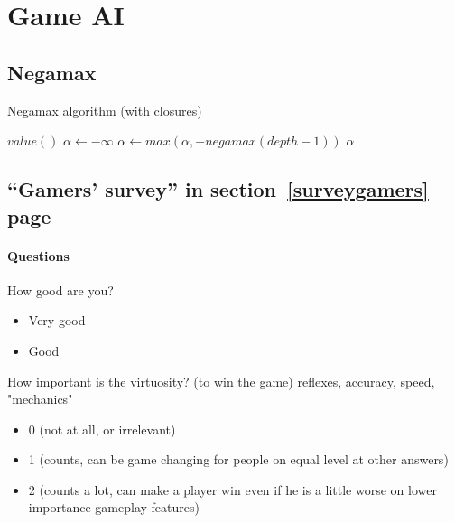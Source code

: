\chapter{Game AI}
\label{apdx:gameAI}

\section{Negamax}

\begin{algorithm}
\caption{Negamax algorithm (with closures)}
\label{alg:negamax}
\begin{algorithmic}
        \State \Return $value()$
    \EndIf
    \State $\alpha \leftarrow -\infty$
        \State $\alpha \leftarrow max(\alpha, -negamax(depth-1))$
    \EndFor
    \State \Return $\alpha$
\EndFunction
\end{algorithmic}
\end{algorithm}


\section{``Gamers' survey'' in section~\ref{surveygamers} page~\pageref{surveygamers}}

\label{apdx:survey}
\subsubsection{Questions}

How good are you?
\begin{itemize}
    \item Very good
    \item Good
\end{itemize}


How important is the virtuosity? (to win the game)
reflexes, accuracy, speed, "mechanics"
\begin{itemize}
    \item 0 (not at all, or irrelevant)
    \item 1 (counts, can be game changing for people on equal level at other answers)
    \item 2 (counts a lot, can make a player win even if he is a little worse on lower importance gameplay features)
\end{itemize}


